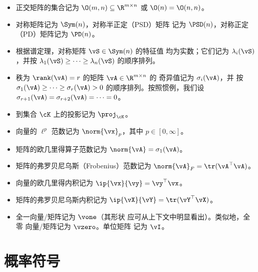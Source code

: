 \begin{itemize}
    \item 正交矩阵的集合记为 \(\O(m, n) \subseteq
        \R^{m \times n}\) 或 \(\O(n) = \O(n, n)\)。
    \item 对称矩阵记为 \(\Sym(n)\)，对称半正定（PSD）矩阵
        记为 \(\PSD(n)\)，对称正定（PD）矩阵记为 \(\PD(n)\)。
    \item 根据谱定理，对称矩阵 \(\vS \in \Sym(n)\) 的特征值
        均为实数；它们记为
        \(\lambda_{i}(\vS)\)，并按 \(\lambda_{1}(\vS)
        \geq \cdots \geq \lambda_{n}(\vS)\) 的顺序排列。
    \item 秩为 \(\rank(\vA) = r\) 的矩阵 \(\vA \in \R^{m \times n}\) 的
        奇异值记为 \(\sigma_{i}(\vA)\)，并
        按 \(\sigma_{1}(\vA) \geq \cdots \geq
        \sigma_{r}(\vA) > 0\) 的顺序排列。按照惯例，我们设 \(\sigma_{r +
        1}(\vA) = \sigma_{r + 2}(\vA) = \cdots = 0\)。
    \item 到集合 \(\cK\) 上的投影记为 \(\proj_{\cK}\)。
    \item 向量的 \(\ell^{p}\) 范数记为
        \(\norm{\vx}_{p}\)，其中 \(p \in [0, \infty]\)。
    \item 矩阵的欧几里得算子范数记为 \(\norm{\vA} =
        \sigma_{1}(\vA)\)。
    \item 矩阵的弗罗贝尼乌斯（Frobenius）范数记为 \(\norm{\vA}_{F} =
        \tr(\vA^{\top}\vA)\)。
    \item 向量的欧几里得内积记为 \(\ip{\vx}{\vy} =
        \vy^{\top} \vx\)。
    \item 矩阵的弗罗贝尼乌斯内积记为 \(\ip{\vX}{\vY}
        = \tr(\vY^{\top}\vX)\)。
    \item 全一向量/矩阵记为 \(\vone\)（其形状
        应可从上下文中明显看出）。类似地，全零
        向量/矩阵记为 \(\vzero\)。单位矩阵
        记为 \(\vI\)。
\end{itemize}

\section*{概率符号}

